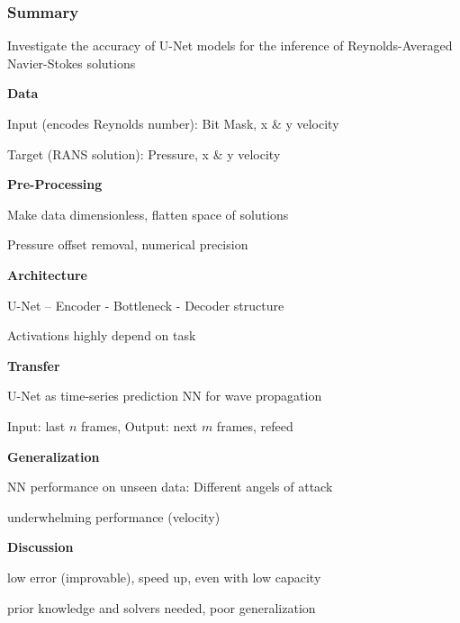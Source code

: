 \begin{frame}
    \frametitle{Summary}
	\vspace*{0.8cm}
Investigate the accuracy of U-Net models for the inference of Reynolds-Averaged Navier-Stokes solutions

\begin{multicols}{2}
    \textbf{Data}
	\begin{PraesentationAufzaehlung}
		\item Input (encodes Reynolds number): Bit Mask, x \& y velocity
		\item Target (RANS solution): Pressure, x \& y velocity
	\end{PraesentationAufzaehlung}
	
	\textbf{Pre-Processing}
	\begin{PraesentationAufzaehlung}
		\item Make data dimensionless, flatten space of solutions
		\item Pressure offset removal, numerical precision
	\end{PraesentationAufzaehlung}
	
	\textbf{Architecture}
	\begin{PraesentationAufzaehlung}
		\item U-Net -- Encoder - Bottleneck - Decoder structure
		\item Activations highly depend on task
	\end{PraesentationAufzaehlung}
	
    \vfill\columnbreak
    \textbf{Transfer} 
	\begin{PraesentationAufzaehlung}
		\item U-Net as time-series prediction NN for wave propagation
		\item Input: last $n$ frames, Output: next $m$ frames, refeed
	\end{PraesentationAufzaehlung}
	
	\textbf{Generalization}
	\begin{PraesentationAufzaehlung}
		\item NN performance on unseen data: Different angels of attack
		\item underwhelming performance (velocity)
	\end{PraesentationAufzaehlung}
	
	\textbf{Discussion}
	\begin{PraesentationAufzaehlung}
		\item low error (improvable), speed up, even with low capacity  
		\item prior knowledge and solvers needed, poor generalization
	\end{PraesentationAufzaehlung}
	
\end{multicols}
\end{frame}
\clearpage